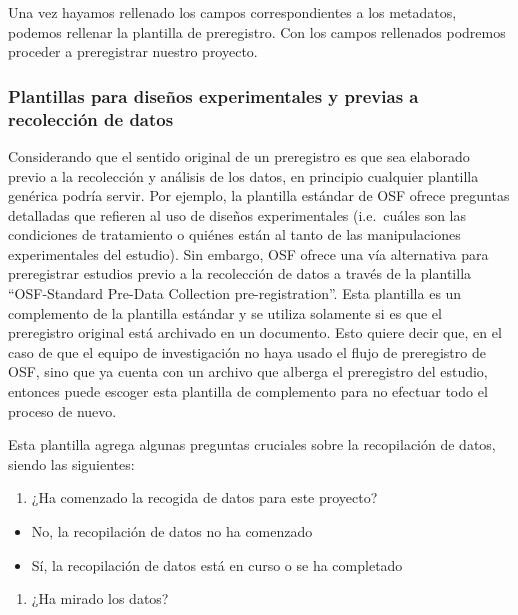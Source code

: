 \documentclass[
  spanish,
  a4paper,
  oneside]{scrbook}
\providecommand{\tightlist}{%
  \setlength{\itemsep}{0pt}\setlength{\parskip}{0pt}}
\begin{document}
Una vez hayamos rellenado los campos correspondientes a los metadatos,
podemos rellenar la plantilla de preregistro. Con los campos rellenados
podremos proceder a preregistrar nuestro proyecto.

\subsubsection{Plantillas para diseños experimentales y previas a
recolección de
datos}\label{plantillas-para-diseuxf1os-experimentales-y-previas-a-recolecciuxf3n-de-datos}

Considerando que el sentido original de un preregistro es que sea
elaborado previo a la recolección y análisis de los datos, en principio
cualquier plantilla genérica podría servir. Por ejemplo, la plantilla
estándar de OSF ofrece preguntas detalladas que refieren al uso de
diseños experimentales (i.e.~cuáles son las condiciones de tratamiento o
quiénes están al tanto de las manipulaciones experimentales del
estudio). Sin embargo, OSF ofrece una vía alternativa para preregistrar
estudios previo a la recolección de datos a través de la plantilla
``OSF-Standard Pre-Data Collection pre-registration''. Esta plantilla es
un complemento de la plantilla estándar y se utiliza solamente si es que
el preregistro original está archivado en un documento. Esto quiere
decir que, en el caso de que el equipo de investigación no haya usado el
flujo de preregistro de OSF, sino que ya cuenta con un archivo que
alberga el preregistro del estudio, entonces puede escoger esta
plantilla de complemento para no efectuar todo el proceso de nuevo.

Esta plantilla agrega algunas preguntas cruciales sobre la recopilación
de datos, siendo las siguientes:

\begin{enumerate}
\def\labelenumi{\arabic{enumi}.}
\tightlist
\item
  ¿Ha comenzado la recogida de datos para este proyecto?
\end{enumerate}

\begin{itemize}
\tightlist
\item
  No, la recopilación de datos no ha comenzado
\item
  Sí, la recopilación de datos está en curso o se ha completado
\end{itemize}

\begin{enumerate}
\def\labelenumi{\arabic{enumi}.}
\setcounter{enumi}{1}
\tightlist
\item
  ¿Ha mirado los datos?
\end{enumerate}
\end{document}
